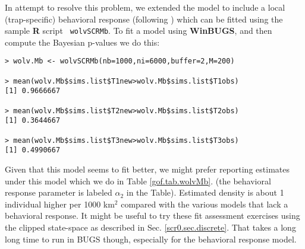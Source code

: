 In attempt to resolve this problem, we extended the model to include a
local (trap-specific)
behavioral response (following \citet{royle_etal:2011jwm}) which can
be fitted using the sample {\bf R} script \mbox{\tt
  wolvSCRMb}. 
To fit a model using {\bf WinBUGS}, and then compute the
Bayesian p-values we do this:
\begin{verbatim}
> wolv.Mb <- wolvSCRMb(nb=1000,ni=6000,buffer=2,M=200)

> mean(wolv.Mb$sims.list$T1new>wolv.Mb$sims.list$T1obs)
[1] 0.9666667

> mean(wolv.Mb$sims.list$T2new>wolv.Mb$sims.list$T2obs)
[1] 0.3644667

> mean(wolv.Mb$sims.list$T3new>wolv.Mb$sims.list$T3obs)
[1] 0.4990667
\end{verbatim}
Given that this model seems to fit better, we might prefer reporting
estimates under this model which we do in
Table \ref{gof.tab.wolvMb}.
(the behavioral response parameter is labeled $\alpha_2$ in the Table).
Estimated density is about 1 individual higher per 1000 km$^2$
compared with the various models that lack a behavioral response.
It might be useful to try these fit assessment exercises using the
clipped state-space as described in Sec. \ref{scr0.sec.discrete}. That takes a long
long time to run in \mbox{BUGS} though, especially for the behavioral
response model.



